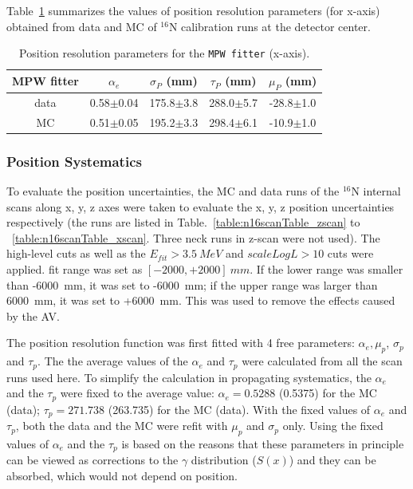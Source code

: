 Table~\ref{table_posresol} summarizes the values of position resolution parameters (for x-axis) obtained from data and MC of {$^{16}$}N calibration runs at the detector center.
\vspace{1mm}
\begin{table}[ht]
	\centering
	\caption{Position resolution parameters for the \texttt{MPW fitter} (x-axis).}
	\label{table_posresol}
	\begin{tabular}{ccccc}
		\toprule
		MPW fitter & $\alpha_e$ & $\sigma_P$ (mm) &  $\tau_P$ (mm)& $\mu_P$ (mm)\\
		\hline 
		data& 0.58$\pm$0.04 & 175.8$\pm$3.8 & 288.0$\pm$5.7 & -28.8$\pm$1.0\\	
		\hline 
		MC & 0.51$\pm$0.05 & 195.2$\pm$3.3 & 298.4$\pm$6.1 & -10.9$\pm$1.0\\
		\bottomrule
	\end{tabular}
\end{table}
\vspace{1mm}

\subsubsection{Position Systematics}
To evaluate the position uncertainties, the MC and data runs of the $^{16}$N internal scans along x, y, z axes were taken to evaluate the x, y, z position uncertainties respectively (the runs are listed in Table.~\ref{table:n16scanTable_zscan} to ~\ref{table:n16scanTable_xscan}. Three neck runs in z-scan were not used). The high-level cuts as well as the $E_{fit}>3.5~MeV$ and $scaleLogL>10$ cuts were applied. 
fit range was set as $[-2000, +2000]~mm$. If the lower range was smaller than -6000~mm, it was set to -6000~mm; if the upper range was larger than 6000~mm, it was set to +6000~mm. This was used to remove the effects caused by the AV.

The position resolution function was first fitted with 4 free parameters: $\alpha_e,\mu_p$, $\sigma_p$ and $\tau_p$. The the average values of the $\alpha_e$
and $\tau_p$ were calculated from all the scan runs used here. To simplify the calculation in propagating systematics, the $\alpha_e$ and the $\tau_p$ were fixed to the average value: $\alpha_e=0.5288$ (0.5375) for the MC (data); $\tau_p=271.738$ (263.735) for the MC (data). With the fixed values of $\alpha_e$ and $\tau_p$, both the data and the MC were refit with $\mu_p$ and $\sigma_p$ only. Using the fixed values of $\alpha_e$ and the $\tau_p$ is based on the reasons that these parameters in principle can be viewed as corrections to the $\gamma$ distribution ($S(x)$) and they can be absorbed, which would not depend on position\cite{waterunidoc}. 

